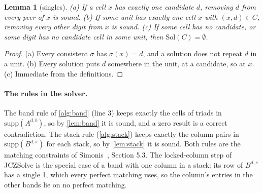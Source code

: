 \documentclass[11pt]{article}
\newtheorem{lemma}[theorem]{Lemma}
\theoremstyle{definition}
\theoremstyle{plain}
\begin{document}
\begin{lemma}[singles]
\label{lem:singles}
(a) If a cell $x$ has exactly one candidate $d$, removing $d$ from every peer of $x$ is sound. (b) If some unit has
exactly one cell $x$ with $(x,d)\in C$, removing every other digit from $x$ is sound. (c) If some cell has no
candidate, or some digit has no candidate cell in some unit, then $\mathrm{Sol}(C)=\emptyset$.
\end{lemma}
\begin{proof}
(a) Every consistent $\sigma$ has $\sigma(x)=d$, and a solution does not repeat $d$ in a unit. (b) Every solution puts
$d$ somewhere in the unit, at a candidate, so at $x$. (c) Immediate from the definitions.
\end{proof}

\paragraph{The rules in the solver.} The band rule of \cref{alg:band} (line 3) keeps exactly the cells of triads in
$\mathrm{supp}(A^{d,b})$, so by \cref{lem:band} it is sound, and a zero result is a correct contradiction. The stack rule
(\cref{alg:stack}) keeps exactly the column pairs in $\mathrm{supp}(B^{d,s})$ for each stack, so by \cref{lem:stack} it
is sound. Both rules are the matching constraints of Simonis~\cite{simonis2005sudoku}, Section 5.3. The locked-column step of
JCZSolve is the special case of a band with one column in a stack: its row of
$B^{d,s}$ has a single 1, which every perfect matching uses, so the column's entries in the other bands lie on no
perfect matching.
\end{document}

